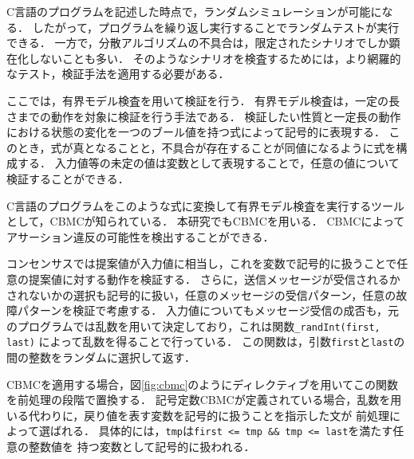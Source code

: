 \documentclass[technicalreport]{ieicej}
\theoremstyle{plain}
\begin{document}
C言語のプログラムを記述した時点で，ランダムシミュレーションが可能になる．
したがって，プログラムを繰り返し実行することでランダムテストが実行できる．
一方で，分散アルゴリズムの不具合は，限定されたシナリオでしか顕在化しないことも多い．
そのようなシナリオを検査するためには，より網羅的なテスト，検証手法を適用する必要がある．

ここでは，有界モデル検査を用いて検証を行う．
有界モデル検査は，一定の長さまでの動作を対象に検証を行う手法である．
検証したい性質と一定長の動作における状態の変化を一つのブール値を持つ式によって記号的に表現する．
このとき，式が真となることと，不具合が存在することが同値になるように式を構成する．
入力値等の未定の値は変数として表現することで，任意の値について検証することができる．

C言語のプログラムをこのような式に変換して有界モデル検査を実行するツールとして，CBMCが知られている\cite{ckl2004}．
本研究でもCBMCを用いる．
CBMCによってアサーション違反の可能性を検出することができる．


コンセンサスでは提案値が入力値に相当し，これを変数で記号的に扱うことで任意の提案値に対する動作を検証する．
さらに，送信メッセージが受信されるかされないかの選択も記号的に扱い，任意のメッセージの受信パターン，任意の故障パターンを検証で考慮する．
入力値についてもメッセージ受信の成否も，元のプログラムでは乱数を用いて決定しており，これは関数\verb|_randInt(first, last)|
によって乱数を得ることで行っている．
この関数は，引数\verb|first|と\verb|last|の間の整数をランダムに選択して返す．

CBMCを適用する場合，図\ref{fig:cbmc}のようにディレクティブを用いてこの関数を前処理の段階で置換する．
記号定数CBMCが定義されている場合，乱数を用いる代わりに，戻り値を表す変数を記号的に扱うことを指示した文が
前処理によって選ばれる．
具体的には，\verb|tmp|は\verb|first <= tmp && tmp <= last|を満たす任意の整数値を
持つ変数として記号的に扱われる．


%
\end{document}

